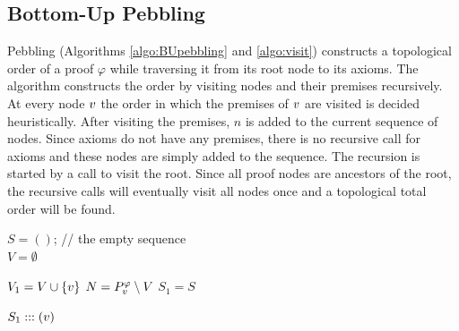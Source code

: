 \documentclass{llncs}
\newcommand{\Premises}[2]{P_{#1}^{#2}}
\begin{document}
\subsection{Bottom-Up Pebbling}

 Pebbling (Algorithms \ref{algo:BUpebbling} and \ref{algo:visit}) constructs a topological order of a proof $\varphi$ while traversing it from its root node to its axioms. The algorithm constructs the order by visiting nodes and their premises recursively. At every node $v$ the order in which the premises of $v$ are visited is decided heuristically. After visiting the premises, $n$ is added to the current sequence of nodes.
Since axioms do not have any premises, there is no recursive call for axioms and these nodes are simply added to the sequence. The recursion is started by a call to visit the root.
Since all proof nodes are ancestors of the root, the recursive calls will eventually visit all nodes once and a topological total order will be found.



\begin{algorithm}[h]
  \BlankLine

	$S = ()$; // the empty sequence \\
	$V = \emptyset$\;
	\Return {}\;

  \caption[.]{}
  \label{algo:BUpebbling}
\end{algorithm}

\begin{algorithm}[h]
	
	$V_1 = V \cup \{v\}$\;
	$N = \Premises{\n}{\varphi} \setminus V$\;
	$S_1 = S$
	
	
	\Return $S_1 ::: (v)$\;
	
  \caption[.]{}
  \label{algo:visit}
\end{algorithm}
\end{document}
